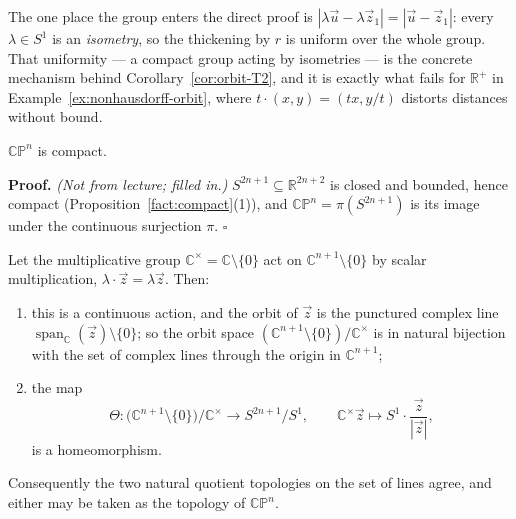 \documentclass[11pt]{report}
\makeatletter
\newcounter{thmcounter}[section]
\renewenvironment{proof}[1][Proof]{\noindent\textbf{#1.} }{\hfill$\square$\par\vspace{5pt}}
\newcommand{\thmlabel}[1]{\edef\@currentlabel{\arabic{section}.\arabic{thmcounter}}\label{#1}}
\newcommand{\leeref}[1]{\par\smallskip{\raggedleft\footnotesize\textsc{Lee}:\ #1\par}}
\makeatother
\begin{document}
\begin{rembox}\label{rem:new-spaces-6}
The one place the group enters the direct proof is $|\lambda \vec u - \lambda \vec z_1| = |\vec u - \vec z_1|$: every $\lambda \in S^1$ is an \emph{isometry}, so the thickening by $r$ is uniform over the whole group. That uniformity --- a compact group acting by isometries --- is the concrete mechanism behind Corollary~\ref{cor:orbit-T2}, and it is exactly what fails for $\mathbb{R}^+$ in Example~\ref{ex:nonhausdorff-orbit}, where $t \cdot (x,y) = (tx, y/t)$ distorts distances without bound.
\end{rembox}

\begin{propbox}\thmlabel{prop:cpn-compact}
$\mathbb{CP}^n$ is compact.
\leeref{Problem 1-9}
\end{propbox}

\begin{proof}
\textit{(Not from lecture; filled in.)} $S^{2n+1} \subseteq \mathbb{R}^{2n+2}$ is closed and bounded, hence compact (Proposition~\ref{fact:compact}(1)), and $\mathbb{CP}^n = \pi(S^{2n+1})$ is its image under the continuous surjection $\pi$.
\end{proof}

\begin{propbox}\thmlabel{prop:cpn-lines}
Let the multiplicative group $\mathbb{C}^\times = \mathbb{C} \setminus \{0\}$ act on $\mathbb{C}^{n+1} \setminus \{0\}$ by scalar multiplication, $\lambda \cdot \vec z = \lambda \vec z$. Then:
\begin{enumerate}
    \item this is a continuous action, and the orbit of $\vec z$ is the punctured complex line $\operatorname{span}_{\mathbb{C}}(\vec z) \setminus \{0\}$; so the orbit space $(\mathbb{C}^{n+1} \setminus \{0\})/\mathbb{C}^\times$ is in natural bijection with the set of complex lines through the origin in $\mathbb{C}^{n+1}$;
    \item the map
    \[
    \Theta : \big(\mathbb{C}^{n+1} \setminus \{0\}\big)/\mathbb{C}^\times \longrightarrow S^{2n+1}/S^1, \qquad \mathbb{C}^\times\vec z \longmapsto S^1 \cdot \frac{\vec z}{|\vec z|},
    \]
    is a homeomorphism.
\end{enumerate}
Consequently the two natural quotient topologies on the set of lines agree, and either may be taken as the topology of $\mathbb{CP}^n$.
\leeref{Problem 1-9}
\end{propbox}
\end{document}
